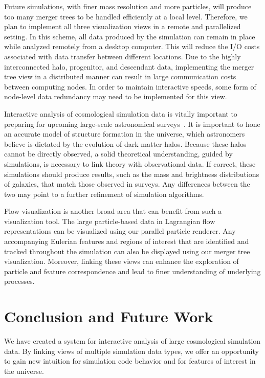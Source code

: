 Future simulations, with finer mass resolution and more particles, will produce too many merger trees to be handled efficiently at a local level. Therefore, we plan to implement all three visualization views in a remote and parallelized setting. In this scheme, all data produced by the simulation can remain in place while analyzed remotely from a desktop computer. This will reduce the I/O costs associated with data transfer between different locations. 
Due to the highly interconnected halo, progenitor, and descendant data, implementing the merger tree view in a distributed manner can result in large communication costs between computing nodes. In order to maintain interactive speeds, some form of node-level data redundancy may need to be implemented for this view.

Interactive analysis of cosmological simulation data is vitally important to preparing for upcoming large-scale astronomical surveys~\cite{skysurvey}. It is important to hone an accurate model of structure formation in the universe, which astronomers believe is dictated by the evolution of dark matter halos. Because these halos cannot be directly observed, a solid theoretical understanding, guided by simulations, is necessary to link theory with observational data. If correct, these simulations should produce results, such as the mass and brightness distributions of galaxies, that match those observed in surveys. Any differences between the two may point to a further refinement of simulation algorithms.

Flow visualization is another broad area that can benefit from such a visualization tool. The large particle-based data in Lagrangian flow representations can be visualized using our parallel particle renderer. Any accompanying Eulerian features and regions of interest that are identified and tracked throughout the simulation can also be displayed using our merger tree visualization. Moreover, linking these views can enhance the exploration of particle and feature correspondence and lead to finer understanding of underlying processes.

\section{Conclusion and Future Work}

We have created a system for interactive analysis of large cosmological simulation data. By linking views of multiple simulation data types, we offer an opportunity to gain new intuition for simulation code behavior and for features of interest in the universe.

